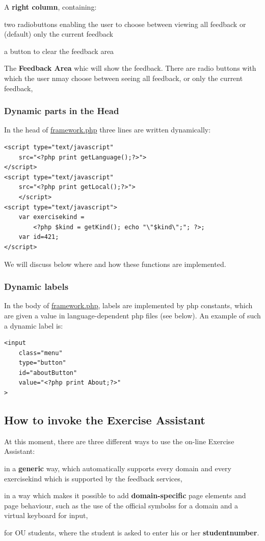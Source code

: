 \documentclass{article}
\begin{document}
A \textbf{right column}, containing:
	\begin{compactitem}
	\item two radiobuttons enabling the user to choose between viewing all feedback or (default) only the
	current feedback
	\item a button to clear the feedback area
	\item The \textbf{Feedback Area} whic will show the feedback. There are radio buttons with which the user nmay choose between seeing all feedback, or only the current feedback,
		\end{compactitem}

\subsubsection{Dynamic parts in the Head}
In the head of \url{framework.php} three lines are written dynamically:
\begin{verbatim}
<script type="text/javascript" 
    src="<?php print getLanguage();?>">
</script>
<script type="text/javascript" 
    src="<?php print getLocal();?>">
    </script>
<script type="text/javascript">
    var exercisekind = 
        <?php $kind = getKind(); echo "\"$kind\";"; ?>; 
    var id=421;
</script>\end{verbatim}
We will discuss below where and how these functions are implemented.

\subsubsection{Dynamic labels}
In the body of \url{framework.php}, labels are implemented by php constants, which are given a value in language-dependent php files (see below). An example of such a dynamic label is:
\begin{verbatim}
<input 
    class="menu" 
    type="button" 
    id="aboutButton" 
    value="<?php print About;?>" 
>
\end{verbatim}

\subsection{How to invoke the Exercise Assistant}
At this moment, there are three different ways to use the on-line Exercise Assistant: 
\begin{compactitem}
\item in a \textbf{generic} way, which automatically supports every domain and every exercisekind 
which is supported by the feedback services, 
\item in a way which makes it possible to add \textbf{domain-specific} page elements and page behaviour, 
such as the use of the official symbolss for a domain and a virtual keyboard for input,
\item for OU students, where the student is asked to enter his or her \textbf{studentnumber}.
\end{compactitem}
\end{document}
